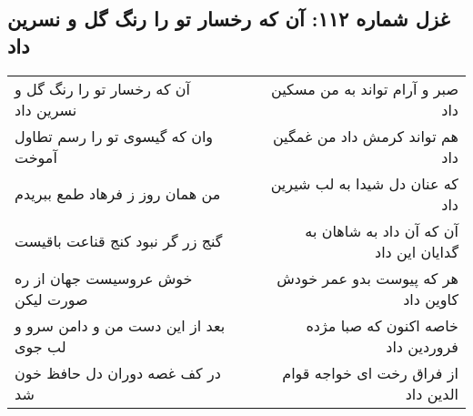 \begin{center}
\section*{غزل شماره ۱۱۲: آن که رخسار تو را رنگ گل و نسرین داد}
\label{sec:sh112}
\begin{longtable}{l p{0.5cm} r}
آن که رخسار تو را رنگ گل و نسرین داد
&&
صبر و آرام تواند به من مسکین داد
\\
وان که گیسوی تو را رسم تطاول آموخت
&&
هم تواند کرمش داد من غمگین داد
\\
من همان روز ز فرهاد طمع ببریدم
&&
که عنان دل شیدا به لب شیرین داد
\\
گنج زر گر نبود کنج قناعت باقیست
&&
آن که آن داد به شاهان به گدایان این داد
\\
خوش عروسیست جهان از ره صورت لیکن
&&
هر که پیوست بدو عمر خودش کاوین داد
\\
بعد از این دست من و دامن سرو و لب جوی
&&
خاصه اکنون که صبا مژده فروردین داد
\\
در کف غصه دوران دل حافظ خون شد
&&
از فراق رخت ای خواجه قوام الدین داد
\\
\end{longtable}
\end{center}
